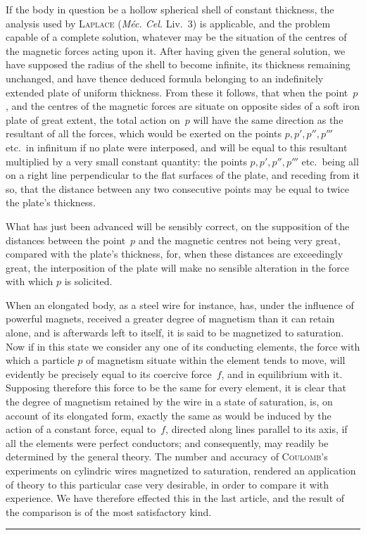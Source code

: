 \documentclass[11pt,notitlepage]{amsart}
\let\Person\textsc
\let\Title\textit
\def\Crule{\begin{center}\rule[.5ex]{5em}{.2pt}\\[10pt]\end{center}}
\begin{document}
If the body in question be a hollow spherical shell of constant
thickness, the analysis used by \Person{Laplace}
(\Title{M\'ec. Cel.} Liv.~3) is applicable, and
the problem capable of a complete solution, whatever may be the situation
of the centres of the magnetic forces acting upon it. After having given the
general solution, we have supposed the radius of the shell to become infinite,
its thickness remaining unchanged, and have thence deduced formula belonging
to an indefinitely extended plate of uniform thickness. From these it follows,
that when the point~$p$, and the centres of the magnetic forces are situate on
opposite sides of a soft iron plate of great extent,
the total action on~$p$ will
have the same direction as the resultant of all the forces, which would be
exerted on the points $p, p', p'', p'''$ etc.\ in
infinitum if no plate were interposed,
and will be equal to this resultant multiplied by a very small constant
quantity: the points $p, p', p'', p'''$ etc.\ being
all on a right line perpendicular
to the flat surfaces of the plate,
and receding from it so, that the distance between
any two consecutive points may be equal to twice the plate's thickness.

What has just been advanced will be sensibly correct, on the supposition
of the distances between the point~$p$ and the magnetic centres not being
very great, compared with the plate's thickness, for, when these distances
are exceedingly great, the interposition of the plate will make no sensible
alteration in the force with which $p$ is solicited.

When an elongated body, as a steel wire for instance, has, under the
influence of powerful magnets, received a greater degree of magnetism than
it can retain alone, and is afterwards left to itself,
it is said to be magnetized
to saturation. Now if in this state we consider any one of its conducting
elements, the force with which a particle $p$ of magnetism situate within the
element tends to move,
will evidently be precisely equal to its coercive force~$f$,
and in equilibrium with it. Supposing therefore this force to be the same for
every element, it is clear that the degree of magnetism retained by the wire
in a state of saturation, is, on account of its elongated form, exactly the same
as would be induced by the action of a constant force, equal to~$f$, directed
along lines parallel to its axis, if all the elements were perfect conductors;
and consequently, may readily be determined by the general theory. The number
and accuracy of \Person{Coulomb}'s experiments
on cylindric wires magnetized to saturation,
rendered an application of theory to this particular case very desirable,
in order to compare it with experience. We have therefore effected this in the
last article, and the result of the comparison is of the most satisfactory kind.
\bigskip
\Crule
\bigskip
\bigskip
\bigskip
\end{document}
